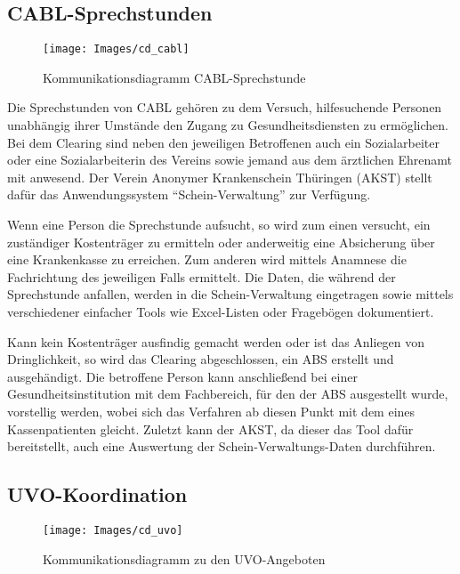 \subsection{CABL-Sprechstunden}\label{sub:cabl}

\begin{figure}[h]
	\centering
	\texttt{[image: Images/cd\_cabl]}
	\caption[Kommunikationsdiagramm CABL-Sprechstunde]{Kommunikationsdiagramm CABL-Sprechstunde}
	\label{fig:cdCABL}
\end{figure}

Die Sprechstunden von \ac{CABL} gehören zu dem Versuch, hilfesuchende Personen unabhängig ihrer Umstände den Zugang zu Gesundheitsdiensten zu ermöglichen. Bei dem Clearing sind neben den jeweiligen Betroffenen auch ein Sozialarbeiter oder eine Sozialarbeiterin des Vereins sowie jemand aus dem ärztlichen Ehrenamt mit anwesend. Der Verein Anonymer Krankenschein Thüringen (\ac{AKST}) stellt dafür das Anwendungssystem \enquote{Schein-Verwaltung} zur Verfügung.

Wenn eine Person die Sprechstunde aufsucht, so wird zum einen versucht, ein zuständiger Kostenträger zu ermitteln oder anderweitig eine Absicherung über eine Krankenkasse zu erreichen. Zum anderen wird mittels Anamnese die Fachrichtung des jeweiligen Falls ermittelt. Die Daten, die während der Sprechstunde anfallen, werden in die Schein-Verwaltung eingetragen sowie mittels verschiedener einfacher Tools wie Excel-Listen oder Fragebögen dokumentiert.

Kann kein Kostenträger ausfindig gemacht werden oder ist das Anliegen von Dringlichkeit, so wird das Clearing abgeschlossen, ein \ac{ABS} erstellt und ausgehändigt. Die betroffene Person kann anschließend bei einer Gesundheitsinstitution mit dem Fachbereich, für den der \ac{ABS} ausgestellt wurde, vorstellig werden, wobei sich das Verfahren ab diesen Punkt mit dem eines Kassenpatienten gleicht. Zuletzt kann der \ac{AKST}, da dieser das Tool dafür bereitstellt, auch eine Auswertung der Schein-Verwaltungs-Daten durchführen.

\subsection{UVO-Koordination}\label{sub:uvo}

\begin{figure}[h]
	\centering
	\texttt{[image: Images/cd\_uvo]}
	\caption[Kommunikationsdiagramm UVO-Angebote]{Kommunikationsdiagramm zu den UVO-Angeboten}
	\label{fig:cdUVO}
\end{figure}

